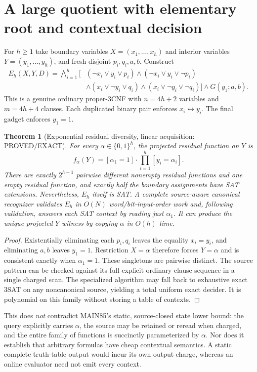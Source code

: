 \documentclass[11pt]{article}
\newtheorem{theorem}{Theorem}
\begin{document}
\section{A large quotient with elementary root and contextual decision}
For $h\ge1$ take boundary variables $X=(x_1,\dots,x_h)$ and interior variables $Y=(y_1,\dots,y_h)$, and fresh disjoint $p_i,q_i,a,b$. Construct
\[
\begin{split}
E_h(X,Y,D)=\bigwedge_{i=1}^h[&
(\neg x_i\lor y_i\lor p_i)\wedge
(\neg x_i\lor y_i\lor\neg p_i)\\
&\wedge(x_i\lor\neg y_i\lor q_i)\wedge
(x_i\lor\neg y_i\lor\neg q_i)]\wedge G(y_1;a,b).
\end{split}
\]
This is a genuine ordinary proper-3CNF with $n=4h+2$ variables and $m=4h+4$ clauses. Each duplicated binary pair enforces $x_i\leftrightarrow y_i$. The final gadget enforces $y_1=1$.
\begin{theorem}[Exponential residual diversity, linear acquisition: PROVED/EXACT]
For every $\alpha\in\{0,1\}^h$, the projected residual function on $Y$ is
\[
f_\alpha(Y)=[\alpha_1=1]\cdot\prod_{i=1}^h [y_i=\alpha_i].
\]
There are exactly $2^{h-1}$ pairwise different nonempty residual functions and one empty residual function, and exactly half the boundary assignments have SAT extensions. Nevertheless, $E_h$ itself is SAT. A complete source-aware canonical recognizer validates $E_h$ in $O(N)$ word/bit-input-order work and, following validation, answers each SAT context by reading just $\alpha_1$. It can produce the unique projected $Y$ witness by copying $\alpha$ in $O(h)$ time.
\end{theorem}
\begin{proof}
Existentially eliminating each $p_i,q_i$ leaves the equality $x_i=y_i$, and eliminating $a,b$ leaves $y_1=1$. Restriction $X=\alpha$ therefore forces $Y=\alpha$ and is consistent exactly when $\alpha_1=1$. These singletons are pairwise distinct. The source pattern can be checked against its full explicit ordinary clause sequence in a single charged scan. The specialized algorithm may fall back to exhaustive exact 3SAT on any noncanonical source, yielding a total uniform exact decider. It is polynomial on this family without storing a table of contexts.
\end{proof}
This does \emph{not} contradict MAIN85's static, source-closed state lower bound: the query explicitly carries $\alpha$, the source may be retained or reread when charged, and the entire family of functions is succinctly parameterized by $\alpha$. Nor does it establish that arbitrary formulas have cheap contextual semantics. A static complete truth-table output would incur its own output charge, whereas an online evaluator need not emit every context.
\end{document}
